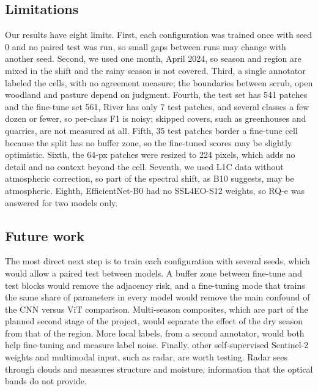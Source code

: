 \subsection{Limitations}\label{sec:limitations}

Our results have eight limits. First, each configuration was trained once with seed 0 and no
paired test was run, so small gaps between runs may change with another seed. Second, we used one
month, April 2024, so season and region are mixed in the shift and the rainy season is not
covered. Third, a single annotator labeled the cells, with no agreement measure; the boundaries
between scrub, open woodland and pasture depend on judgment. Fourth, the test set has 541
patches and the fine-tune set 561, River has only 7 test patches, and several classes a few
dozen or fewer, so per-class F1 is noisy; skipped
covers, such as greenhouses and quarries, are not measured at all. Fifth, 35 test patches border
a fine-tune cell because the split has no buffer zone, so the fine-tuned scores may be slightly
optimistic. Sixth, the 64-px patches were resized to 224 pixels, which adds no detail and no
context beyond the cell. Seventh, we used L1C data without atmospheric correction, so part of the
spectral shift, as B10 suggests, may be atmospheric. Eighth, EfficientNet-B0 had no SSL4EO-S12
weights, so RQ-e was answered for two models only.

\subsection{Future work}

The most direct next step is to train each configuration with several seeds, which would allow a
paired test between models. A buffer zone between fine-tune and test blocks would remove the
adjacency risk, and a fine-tuning mode that trains the same share of parameters in every model
would remove the main confound of the CNN versus ViT comparison. Multi-season composites, which
are part of the planned second stage of the project, would separate the effect of the dry season
from that of the region. More local labels, from a second annotator, would both help fine-tuning
and measure label noise. Finally, other self-supervised Sentinel-2 weights and multimodal input,
such as radar, are worth testing. Radar sees through clouds and measures structure and
moisture, information that the optical bands do not provide.
